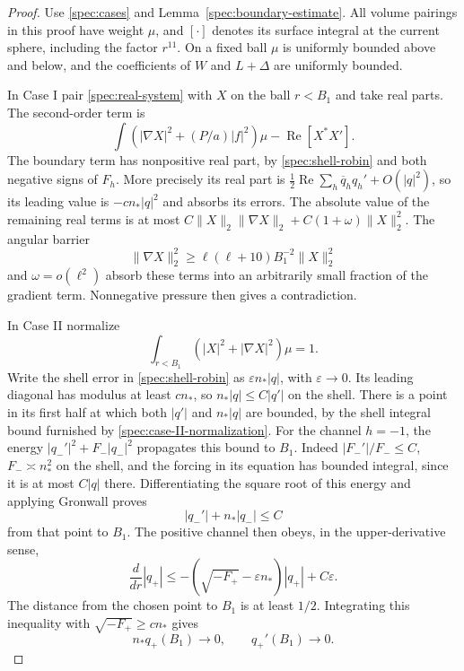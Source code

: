 \begin{proof}
Use \eqref{spec:cases} and Lemma~\ref{spec:boundary-estimate}.
All volume pairings in this proof have weight $\mu$, and $[\cdot]$
denotes its surface integral at the current sphere, including the
factor $r^{11}$. On a fixed ball $\mu$ is uniformly bounded above and
below, and the coefficients of $W$ and $L+\Delta$ are uniformly
bounded.

In Case I pair \eqref{spec:real-system} with $X$ on the ball $r<B_1$
and take real parts. The second-order term is
\[
 \int(|\nabla X|^2+(P/a)|f|^2)\mu-\operatorname{Re}[X^*X'].
\]
The boundary term has nonpositive real part, by
\eqref{spec:shell-robin} and both negative signs of $F_h$.
More precisely its real part is
$\frac12\operatorname{Re}\sum_h\overline q_hq_h'+O(|q|^2)$, so its
leading value is $-c n_*|q|^2$ and absorbs its errors.
The absolute value of the remaining real terms is at most
$C\|X\|_2\|\nabla X\|_2+C(1+\omega)\|X\|_2^2$.
The angular barrier
\[
 \|\nabla X\|_2^2\ge
 \ell(\ell+10)B_1^{-2}\|X\|_2^2
\]
and $\omega=o(\ell^2)$ absorb these terms into an arbitrarily small
fraction of the gradient term. Nonnegative pressure then gives a
contradiction.

In Case II normalize
\begin{equation}\label{spec:case-II-normalization}
 \int_{r<B_1}(|X|^2+|\nabla X|^2)\mu=1.
\end{equation}
Write the shell error in \eqref{spec:shell-robin} as
$\varepsilon n_*|q|$, with $\varepsilon\to0$. Its leading diagonal
has modulus at least $c n_*$, so $n_*|q|\le C|q'|$ on the shell.
There is a point in its first half at which both $|q'|$ and
$n_*|q|$ are bounded, by the shell integral bound furnished by
\eqref{spec:case-II-normalization}.
For the channel $h=-1$, the energy
$|q_-'|^2+F_-|q_-|^2$ propagates this bound to $B_1$.
Indeed $|F_-'|/F_-\le C$, $F_-\asymp n_*^2$ on the shell, and the
forcing in its equation has bounded integral, since it is at most
$C|q|$ there. Differentiating the square root of this energy and
applying Gronwall proves
\[
 |q_-'|+n_*|q_-|\le C
\]
from that point to $B_1$.
The positive channel then obeys, in the upper-derivative sense,
\[
 \frac{d}{dr}|q_+|
 \le-(\sqrt{-F_+}-\varepsilon n_*)|q_+|+C\varepsilon.
\]
The distance from the chosen point to $B_1$ is at least $1/2$.
Integrating this inequality with $\sqrt{-F_+}\ge c n_*$ gives
\begin{equation}\label{spec:plus-vanishing}
 n_*q_+(B_1)\longrightarrow0,\qquad q_+'(B_1)\longrightarrow0.
\end{equation}


\end{proof}
